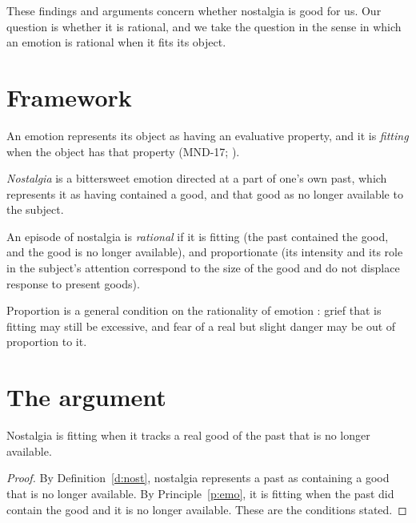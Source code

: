 \documentclass{situationist-preprint}
\begin{document}
These findings and arguments concern whether nostalgia is good for us. Our question is whether it is rational, and we take the question in the sense in which an emotion is rational when it fits its object.

\section{Framework}

\begin{principle}\label{p:emo}
An emotion represents its object as having an evaluative property, and it is \emph{fitting} when the object has that property (MND-17; \citealp{DArmsJacobson2000}).
\end{principle}

\begin{definition}[Nostalgia]\label{d:nost}
\emph{Nostalgia} is a bittersweet emotion directed at a part of one's own past, which represents it as having contained a good, and that good as no longer available to the subject.
\end{definition}

\begin{definition}\label{d:rat}
An episode of nostalgia is \emph{rational} if it is fitting (the past contained the good, and the good is no longer available), and proportionate (its intensity and its role in the subject's attention correspond to the size of the good and do not displace response to present goods).
\end{definition}

Proportion is a general condition on the rationality of emotion \citep{deSousa1987}: grief that is fitting may still be excessive, and fear of a real but slight danger may be out of proportion to it.

\section{The argument}

\begin{lemma}\label{l:fit}
Nostalgia is fitting when it tracks a real good of the past that is no longer available.
\end{lemma}

\begin{proof}
By Definition~\ref{d:nost}, nostalgia represents a past as containing a good that is no longer available. By Principle~\ref{p:emo}, it is fitting when the past did contain the good and it is no longer available. These are the conditions stated.
\end{proof}
\end{document}
